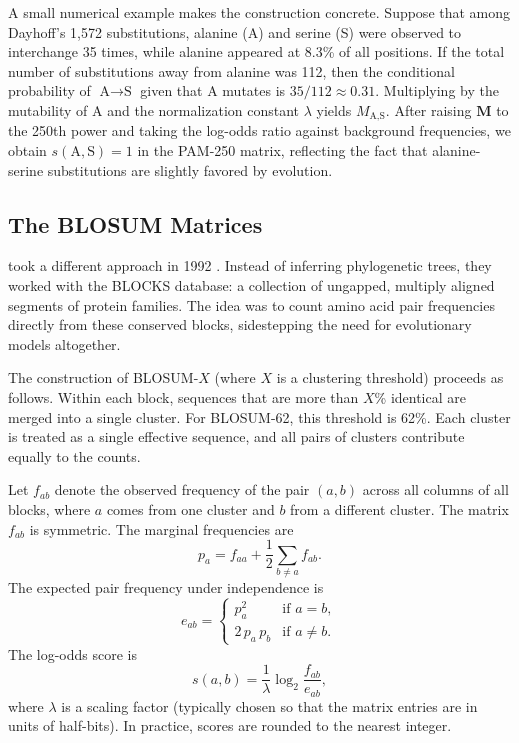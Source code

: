 A small numerical example makes the construction concrete. Suppose that among Dayhoff's 1,572 substitutions, alanine (A) and serine (S) were observed to interchange 35 times, while alanine appeared at 8.3\% of all positions. If the total number of substitutions away from alanine was 112, then the conditional probability of $\text{A} \to \text{S}$ given that A mutates is $35/112 \approx 0.31$. Multiplying by the mutability of A and the normalization constant $\lambda$ yields $M_{\text{A},\text{S}}$. After raising $\mathbf{M}$ to the 250th power and taking the log-odds ratio against background frequencies, we obtain $s(\text{A},\text{S}) = 1$ in the PAM-250 matrix, reflecting the fact that alanine-serine substitutions are slightly favored by evolution.


\subsection{The BLOSUM Matrices}
\label{sec:blosum}

 took a different approach in 1992 \cite{henikoff1992}. Instead of inferring phylogenetic trees, they worked with the BLOCKS database: a collection of ungapped, multiply aligned segments of protein families. The idea was to count amino acid pair frequencies directly from these conserved blocks, sidestepping the need for evolutionary models altogether.

The construction of BLOSUM-$X$ (where $X$ is a clustering threshold) proceeds as follows. Within each block, sequences that are more than $X$\% identical are merged into a single cluster. For BLOSUM-62, this threshold is 62\%. Each cluster is treated as a single effective sequence, and all pairs of clusters contribute equally to the counts.

Let $f_{ab}$ denote the observed frequency of the pair $(a,b)$ across all columns of all blocks, where $a$ comes from one cluster and $b$ from a different cluster. The matrix $f_{ab}$ is symmetric. The marginal frequencies are
\begin{equation}
  \label{eq:blosum-marginal}
  p_a = f_{aa} + \frac{1}{2}\sum_{b \neq a} f_{ab}.
\end{equation}
The expected pair frequency under independence is
\begin{equation}
  \label{eq:blosum-expected}
  e_{ab} = \begin{cases} p_a^2 & \text{if } a = b, \\ 2\, p_a \, p_b & \text{if } a \neq b. \end{cases}
\end{equation}
The log-odds score is
\begin{equation}
  \label{eq:blosum-score}
  s(a,b) = \frac{1}{\lambda} \log_2 \frac{f_{ab}}{e_{ab}},
\end{equation}
where $\lambda$ is a scaling factor (typically chosen so that the matrix entries are in units of half-bits). In practice, scores are rounded to the nearest integer.

